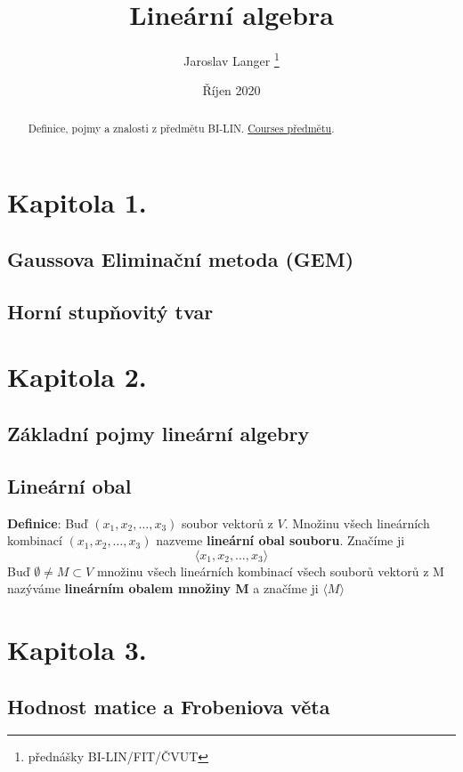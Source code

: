\documentclass[12pt, letterpaper, twoside]{article}
\title{Lineární algebra}
\author{Jaroslav Langer \thanks{přednášky BI-LIN/FIT/ČVUT}}
\date{Říjen 2020}
\begin{document}
\maketitle

\tableofcontents

\begin{abstract}
Definice, pojmy a znalosti z předmětu BI-LIN. \href{https://courses.fit.cvut.cz/BI-LIN/}{Courses předmětu}.
\end{abstract}

\section{Kapitola 1.}
\subsection{Gaussova Eliminační metoda (GEM)}

\subsection{Horní stupňovitý tvar}

\section{Kapitola 2.}
\subsection*{Základní pojmy lineární algebry}

\subsection{Lineární obal}
\textbf{Definice}: Buď $(x_{1},x_{2},\dots, x_{3})$ soubor vektorů z $V$. 
Množinu všech lineárních kombinací $(x_{1},x_{2},\dots, x_{3})$ nazveme \textbf{lineární obal souboru}.
Značíme ji
\[
    \langle x_{1},x_{2},\dots, x_{3} \rangle
\]
Buď $\emptyset \neq M \subset V$ množinu všech lineárních kombinací všech souborů vektorů z M nazýváme
\textbf{lineárním obalem množiny M} a značíme ji $\langle M \rangle$


\section{Kapitola 3.}
\subsection*{Hodnost matice a Frobeniova věta}
\end{document}
